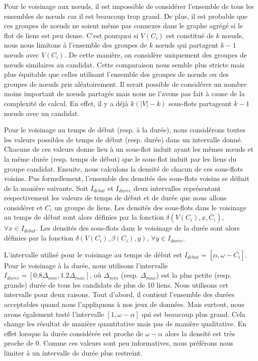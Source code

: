 Pour le voisinage aux n\oe{}uds, il est impossible de considérer l'ensemble de tous les ensembles de n\oe{}uds car il est beaucoup trop grand.
De plus, il est probable que ces groupes de n\oe{}uds ne soient même pas connexes dans le graphe agrégé si le flot de liens est peu dense.
C'est pourquoi si $V(C_i)$ est constitué de $k$ n\oe{}uds, nous nous limitons à l'ensemble des groupes de $k$ n\oe{}uds qui partagent $k-1$ n\oe{}uds avec $V(C_i)$.
De cette manière, on considère uniquement des groupes de n\oe{}uds similaires au candidat.
Cette comparaison nous semble plus stricte mais plus équitable que celles utilisant l'ensemble des groupes de n\oe{}uds ou des groupes de n\oe{}uds pris aléatoirement.
Il serait possible de considérer un nombre moins important de n\oe{}uds partagés mais nous ne l'avons pas fait à cause de la complexité de calcul.
En effet, il y a déjà $k(|V|-k)$ sous-flots partageant $k-1$ n\oe{}uds avec un candidat.

Pour le voisinage au temps de début (resp. à la durée), nous considérons toutes les valeurs possibles de temps de début (resp. durée) dans un intervalle donné.
Chacune de ces valeurs donne lieu à un sous-flot induit ayant les mêmes n\oe{}uds et la même durée (resp. temps de début) que le sous-flot induit par les liens du groupe candidat.
Ensuite, nous calculons la densité de chacun de ces sous-flots voisins.
Pus formellement, l'ensemble des densités des sous-flots voisins se définit de la manière suivante.
Soit $I_{d\acute{e}but}$ et $I_{dur\acute{e}e}$ deux intervalles représentant respectivement les valeurs de temps de début et de durée que nous allons considérer et $C_i$ un groupe de liens.
Les densités des sous-flots dans le voisinage au temps de début sont alors définies par la fonction $\delta(V(C_i),x, \bar{C_i})$, $\forall x \in I_{d\acute{e}but}$.
Les densités des sous-flots dans le voisinage de la durée sont alors définies par la fonction $\delta(V(C_i),\beta(C_i), y)$, $\forall y \in I_{dur\acute{e}e}$.

L'intervalle utilisé pour le voisinage au temps de début est $I_{d\acute{e}but}=[\alpha, \omega-\bar{C_i}]$.
Pour le voisinage à la durée, nous utilisons l'intervalle $I_{dur\acute{e}e}=[0.8\Delta_{min}, 1.2\Delta_{max}]$, où $\Delta_{min}$ (resp. $\Delta_{max}$) est la plus petite (resp. grande) durée de tous les candidats de plus de 10 liens.
Nous utilisons cet intervalle pour deux raisons.
Tout d'abord, il contient l'ensemble des durées acceptables quand nous l'appliquons à nos jeux de données.
Mais surtout, nous avons également testé l'intervalle $[1,\omega-\alpha]$ qui est beaucoup plus grand.
Cela change les résultat de manière quantitative mais pas de manière qualitative.
En effet lorsque la durée considérée est proche de $\omega-\alpha$ alors la densité est très proche de $0$.
Comme ces valeurs sont peu informatives, nous préférons nous limiter à un intervalle de durée plus restreint.
\bigskip

